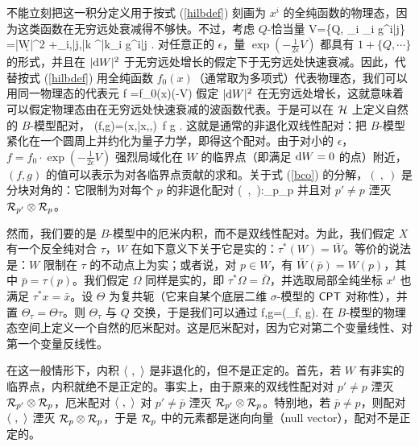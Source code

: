 不能立刻把这一积分定义用于按式 (\ref{hilbdef}) 刻画为 $x^i$ 的全纯函数的物理态，因为这类函数在无穷远处衰减得不够快。不过，考虑 $Q$-恰当量
\be\label{zoro} V=\left\{Q, \sum_i \theta_i g^{i\bar j}\right\} =\left|\d W\right|^2 +\sum_{i,\bar j,\bar k} \chi^{\bar k}\theta_i g^{i\bar j} .  \ee
对任意正的 $\epsilon$，量 $\exp\left(-\frac{1}{2\epsilon}V\right)$ 都具有 $1+\{Q,\cdots\}$ 的形式，并且在 $|{\mathrm d} W|^2$ 于无穷远处增长的假定下于无穷远处快速衰减。因此，代替按式 (\ref{hilbdef}) 用全纯函数 $f_0(x)$（通常取为多项式）代表物理态，我们可以用同一物理态的代表元
\be\label{todo}f =f_0(x)\cdot \exp\left(-V\right)\ee
假定 $|{\mathrm d} W|^2$ 在无穷远处增长，这就意味着可以假定物理态由在无穷远处快速衰减的波函数代表。于是可以在 ${\mathcal H}$ 上定义自然的 $B$-模型配对，
\be\label{zinparts} (f,g)=\int \dD(x,\bar x,\chi,\theta)\, f g . \ee
这就是通常的非退化双线性配对：把 $B$-模型紧化在一个圆周上并约化为量子力学，即得这个配对。由于对小的 $\epsilon$，$f =f_0\cdot \exp\left(-\frac{1}{2\epsilon}V\right)$ 强烈局域化在 $W$ 的临界点（即满足 ${\mathrm d} W=0$ 的点）附近，$(f,g)$ 的值可以表示为对各临界点贡献的求和。关于式 (\ref{bco}) 的分解，$(~,~)$ 是分块对角的：它限制为对每个 $p$ 的非退化配对
\be\label{restro}(~,~):\RR_p\otimes \RR_p\to \C\ee
并且对 $p'\not=p$ 湮灭 ${\mathcal R}_{p'}\otimes {\mathcal R}_p$。

然而，我们要的是 $B$-模型中的厄米内积，而不是双线性配对。为此，我们假定 $X$ 有一个反全纯对合 $\tau$，$W$ 在如下意义下关于它是实的：$\tau^*(W)=\bar W$。等价的说法是：$W$ 限制在 $\tau$ 的不动点上为实；或者说，对 $p\in W$，有 $\bar W(\bar p)=W(p)$，其中 $\bar p=\tau(p)$。我们假定 $\varOmega$ 同样是实的，即 $\tau^*\varOmega=\bar\varOmega$，并选取局部全纯坐标 $x^i$ 也满足 $\tau^*x =\bar x$。设 $\Theta$ 为复共轭（它来自某个底层二维 $\sigma$-模型的 $\sf{CPT}$ 对称性），并置 $\Theta_\tau=\Theta\tau$。则 $\Theta_\tau$ 与 $Q$ 交换，于是我们可以通过
\be\label{inparts}\la f,g\ra =(\Theta_\tau f, g). \ee
在 $B$-模型的物理态空间上定义一个自然的厄米配对。这是厄米配对，因为它对第二个变量线性、对第一个变量反线性。

在这一般情形下，内积 $\langle~,~\rangle$ 是非退化的，但不是正定的。首先，若 $W$ 有非实的临界点，内积就绝不是正定的。事实上，由于原来的双线性配对对 $p'\not=p$ 湮灭 ${\mathcal R}_{p'}\otimes {\mathcal R}_p$，厄米配对 $\langle~,~\rangle$ 对 $p'\not=\bar p$ 湮灭 ${\mathcal R}_{p'}\otimes {\mathcal R}_p$。特别地，若 $\bar p\not=p$，则配对 $\langle~,~\rangle$ 湮灭 ${\mathcal R}_p \otimes {\mathcal R}_p$，于是 ${\mathcal R}_p$ 中的元素都是迷向向量（null vector），配对不是正定的。

